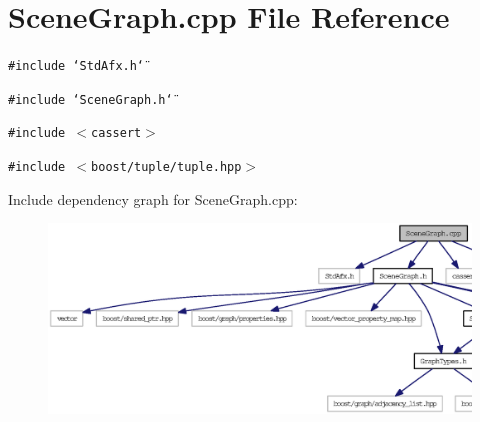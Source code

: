 \section{SceneGraph.cpp File Reference}
\label{SceneGraph_8cpp}


{\tt \#include \char`\"{}StdAfx.h\char`\"{}}\par
{\tt \#include \char`\"{}SceneGraph.h\char`\"{}}\par
{\tt \#include $<$cassert$>$}\par
{\tt \#include $<$boost/tuple/tuple.hpp$>$}\par


Include dependency graph for SceneGraph.cpp:\nopagebreak
\begin{figure}[H]
\begin{center}
\leavevmode
\includegraphics[width=397pt]{SceneGraph_8cpp__incl}
\end{center}
\end{figure}
